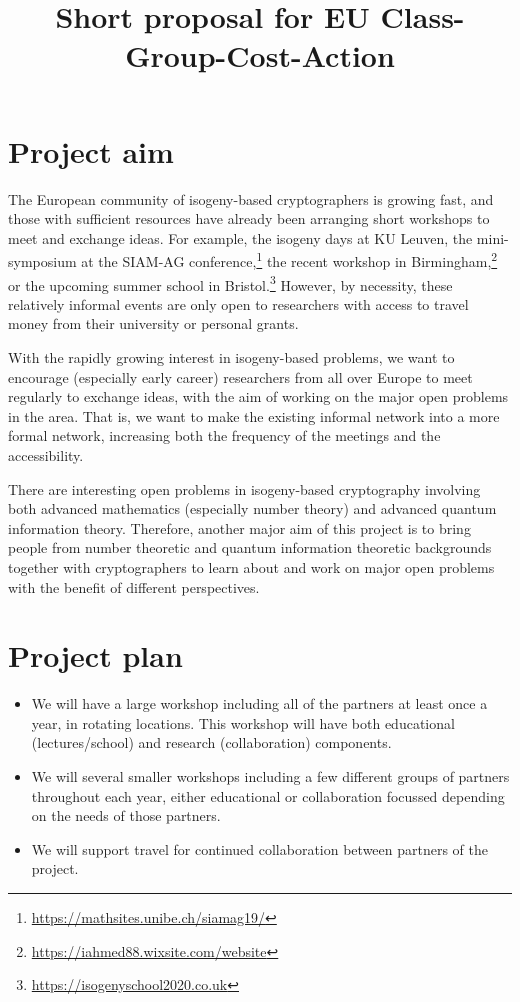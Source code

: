 \documentclass{article}
\begin{document}
\newcommand{\red}{\color{red}}

\title{Short proposal for EU Class-Group-Cost-Action}

\maketitle

\section{Project aim}

The European community of isogeny-based cryptographers is growing fast,
and those with sufficient resources have already been arranging short workshops to meet and exchange ideas.
For example, the isogeny days at KU Leuven,
the mini-symposium at the SIAM-AG conference,\footnote{
\url{https://mathsites.unibe.ch/siamag19/}}
the recent workshop in Birmingham,\footnote{
\url{https://iahmed88.wixsite.com/website}}
or the upcoming summer school in Bristol.\footnote{
\url{https://isogenyschool2020.co.uk}}
However, by necessity, these relatively informal events are only open to
researchers with access to travel money from their university or personal grants.

With the rapidly growing interest in isogeny-based problems,
we want to encourage (especially early career) researchers from all over Europe
to meet regularly to exchange ideas, 
with the aim of working on the major open problems in the area.
That is, we want to make the existing informal network into a more formal network,
increasing both the frequency of the meetings and the accessibility.

There are interesting open problems in isogeny-based cryptography 
involving both advanced mathematics (especially number theory) and advanced quantum information theory.
Therefore, another major aim of this project is to bring people from number theoretic and quantum information theoretic backgrounds together with cryptographers to learn about and work on major open problems with the benefit of different perspectives.

\section{Project plan}

\begin{itemize}
	\item We will have a large workshop including all of the partners at least once a year, in rotating locations. 
	This workshop will have both educational (lectures/school) and research (collaboration) components.
	\item We will several smaller workshops including a few different groups of partners throughout each year, either educational or collaboration focussed depending on the needs of those partners.
	\item We will support travel for continued collaboration between partners of the project.
\end{itemize}
\end{document}
